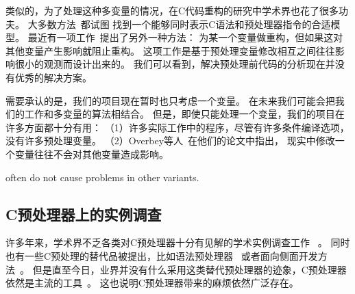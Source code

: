 类似的，为了处理这种多变量的情况，在C代码重构的研究中学术界也花了很多功夫。
大多数方法~\parencite{Garrido2002,Vittek2003,Spinellis2003,Garrido2013}都试图
找到一个能够同时表示C语法和预处理器指令的合适模型。
最近有一项工作~\parencite{Overbey2014}提出了另外一种方法：
为某一个变量做重构，但如果这对其他变量产生影响就阻止重构。
这项工作是基于预处理变量修改相互之间往往影响很小的观测而设计出来的。
我们可以看到，解决预处理前代码的分析现在并没有优秀的解决方案。

需要承认的是，我们的项目现在暂时也只考虑一个变量。
在未来我们可能会把我们的工作和多变量的算法相结合。
但是，即使只能处理一个变量，我们的项目在许多方面都十分有用：
（1）许多实际工作中的程序，尽管有许多条件编译选项，没有许多预处理变量。
（2）Overbey等人~\parencite{Overbey2014}在他们的论文中指出，
现实中修改一个变量往往不会对其他变量造成影响。

often do not cause problems in other variants.%




%
%

\subsection{C预处理器上的实例调查}
许多年来，学术界不乏各类对C预处理器十分有见解的学术实例调查工作
~\parencite{Spencer92,ernst2002empirical,Liebig2011}。
同时也有一些C预处理的替代品被提出，比如语法预处理器~\parencite{Weise1993,McCloskey:2005}
或者面向侧面开发方法~\parencite{Lohmann2006,Adams2009,Boucher2010}。
但是直至今日，业界并没有什么采用这类替代预处理器的迹象，C预处理器依然是主流的工具~\parencite{Medeiros2015}。
这也说明C预处理器带来的麻烦依然广泛存在。



